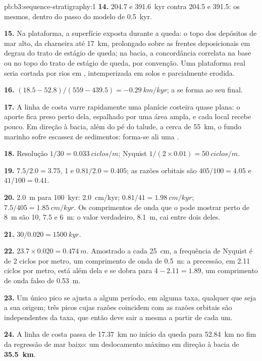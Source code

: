 \begin{solution}{pb:b3:sequence-stratigraphy:1}
\textbf{14.} 204.7 e \qty{391.6}{kyr} contra 204.5 e 391.5: os mesmos,
dentro do passo do modelo de \qty{0.5}{kyr}.

\textbf{15.} Na plataforma, a superfície exposta durante a queda: o topo dos
depósitos de mar alto, da charneira até \qty{17}{km}, prolongado sobre as
frentes deposicionais em degrau do trato de estágio de queda; na bacia, a
concordância correlata na base ou no topo do trato de estágio de queda, por
convenção. Uma plataforma real seria cortada por rios em ,
intemperizada em solos e parcialmente erodida.

\textbf{16.} $(18.5 - 52.8)/(559 - 439.5) = \qty{-0.29}{km/kyr}$; a
 se forma ao seu final.

\textbf{17.} A linha de costa varre rapidamente uma planície costeira quase
plana: o aporte fica preso perto dela, espalhado por uma área ampla, e cada
local recebe pouco. Em direção à bacia, além do pé do talude, a cerca de \qty{55}{km}, o
fundo marinho sofre escassez de sedimentos: forma-se ali uma .

\textbf{18.} Resolução $1/30 = \qty{0.033}{ciclos/m}$; Nyquist $1/(2\times
0.01) = \qty{50}{ciclos/m}$.

\textbf{19.} $7.5/2.0 = 3.75$, 1 e $0.81/2.0 = 0.405$; as razões orbitais
são $405/100 = 4.05$ e $41/100 = 0.41$.

\textbf{20.} \qty{2.0}{m} para \qty{100}{kyr}: \qty{2.0}{cm/kyr}; $0.81/41 =
\qty{1.98}{cm/kyr}$; $7.5/405 = \qty{1.85}{cm/kyr}$. Os comprimentos de onda
que o  pode mostrar perto de \qty{8}{m} são 10, 7.5 e \qty{6}{m}:
o valor verdadeiro, \qty{8.1}{m}, cai entre dois deles.

\textbf{21.} $30/0.020 = \qty{1500}{kyr}$.

\textbf{22.} $23.7\times0.020 = \qty{0.474}{m}$. Amostrado a cada
\qty{25}{cm}, a frequência de Nyquist é de 2 ciclos por metro, um comprimento
de onda de \qty{0.5}{m}: a precessão, em 2.11 ciclos por metro, está além dela
e se dobra para $4 - 2.11 = 1.89$, um comprimento de onda falso de \qty{0.53}{m}.

\textbf{23.} Um único pico se ajusta a algum período, em alguma taxa, qualquer
que seja a sua origem; três picos cujas razões coincidem com as razões orbitais
são independentes da taxa, que então deve sair a mesma a partir de cada um.

\textbf{24.} A linha de costa passa de \qty{17.37}{km} no início da queda para
\qty{52.84}{km} no fim da regressão de mar baixo: um deslocamento máximo em
direção à bacia de \textbf{\qty[text-series-to-math=true]{35.5}{km}}.
\end{solution}
